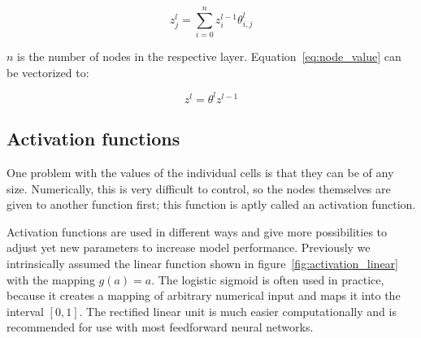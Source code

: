 \begin{equation}
    z^l_j = \sum^n_{i=0}z^{l-1}_i\theta^l_{i, j}
    \label{eq:node_value}
\end{equation}

$n$ is the number of nodes in the respective layer. Equation~\eqref{eq:node_value} can be vectorized to:

\begin{equation}
    z^l = \theta^l z^{l-1}
    \label{eq:node_value_vectorized}
\end{equation}

\subsection{Activation functions}

One problem with the values of the individual cells is that they can be of any size. Numerically, this is very difficult to control, so the nodes themselves are given to another function first; this function is aptly called an activation function.

Activation functions are used in different ways and give more possibilities to adjust yet new parameters to increase model performance.
Previously we intrinsically assumed the linear function shown in figure~\ref{fig:activation_linear} with the mapping $g(a) = a$.
The logistic sigmoid is often used in practice, because it creates a mapping of arbitrary numerical input and maps it into the interval $[0,1]$.
The rectified linear unit is much easier computationally and is recommended for use with most feedforward neural networks\cite[p.169]{Goodfellow2017}\cite{Glorot2011}.

